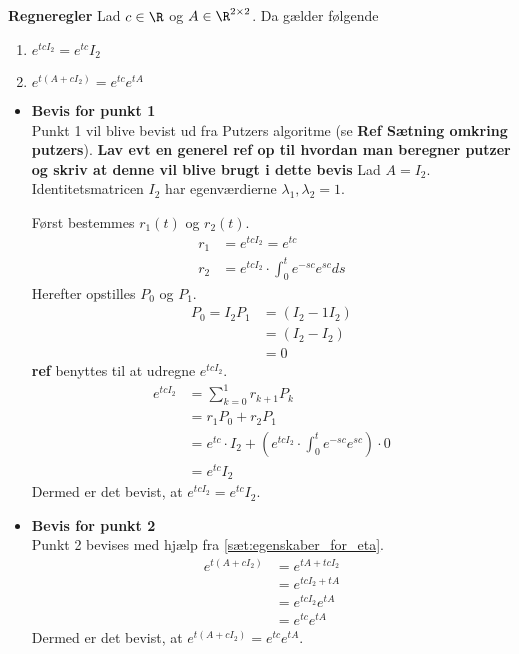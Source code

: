 \begin{thmx}\textbf{Regneregler} \label{sæt:regneregler_for_etcI}
\newline
Lad $c\in\R$ og $A\in\R^{2\times2}$. Da gælder følgende
\begin{enumerate}
    \item $e^{tcI_2} = e^{tc}I_2$
    \item $e^{t(A+cI_2)} = e^{tc}e^{tA}$
\end{enumerate}
\end{thmx}
%
\begin{bev}\textbf{}
\begin{itemize}
\item [] \textbf{Bevis for punkt 1}\\
Punkt 1 vil blive bevist ud fra Putzers algoritme (se \textbf{Ref Sætning omkring putzers}). \textbf{Lav evt en generel ref op til hvordan man beregner putzer og skriv at denne vil blive brugt i dette bevis}
Lad $A=I_2$. Identitetsmatricen $I_2$ har egenværdierne $\lambda_1,\lambda_2=1$.

Først bestemmes $r_1(t)$ og $r_2(t)$. 
%
\begin{align*}
    r_1 &= e^{tcI_2} = e^{tc} \\
    r_2 &= e^{tcI_2}\cdot \int_0^te^{-sc}e^{sc} ds
\end{align*}
%
Herefter opstilles $P_0$ og $P_1$.
\begin{align*}
    P_0 = I_2
    P_1 &= (I_2 - 1I_2) \\
    &= (I_2-I_2)\\
    &= 0 
\end{align*}
%
\textbf{ref} benyttes til at udregne $e^{tcI_2}$. 
%
\begin{align*}
    e^{tcI_2} &= \sum_{k=0}^1 r_{k+1}P_k \\
    &= r_1P_0 + r_2P_1\\
    &= e^{tc} \cdot I_2 + \left(e^{tcI_2}\cdot \int_0^te^{-sc}e^{sc}\right) \cdot 0 \\
    &= e^{tc}I_2
\end{align*}
Dermed er det bevist, at $e^{tcI_2} = e^{tc}I_2$.

\item [] \textbf{Bevis for punkt 2}\\
Punkt 2 bevises med hjælp fra \autoref{sæt:egenskaber_for_eta}.
\begin{align*}
    e^{t(A+cI_2)} &= e^{tA+tcI_2} \\ 
    &= e^{tcI_2+tA}\\ 
    &=e^{tcI_2}e^{tA} \\
    &= e^{tc}e^{tA}
\end{align*}
%
Dermed er det bevist, at $e^{t(A+cI_2)}=e^{tc}e^{tA}$.
%
\end{itemize}
\end{bev}